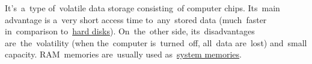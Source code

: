 \label{ram}
It's~a~type of~volatile data storage consisting~of computer chips. Its~main advantage is a~very short access time to~any~stored data (much~faster in~comparison to~\hyperref[harddiskdrive]{hard disks}). On~the~other side, its~disadvantages are~the~volatility (when the~computer is~turned~off, all~data are~lost) and~small capacity. RAM~memories are~usually used as~\hyperref[systemmemory]{system memories}.
